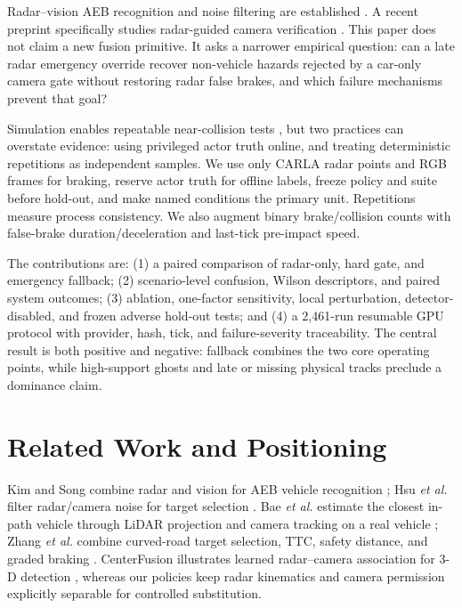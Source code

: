 \documentclass[conference]{IEEEtran}
\begin{document}
Radar--vision AEB recognition and noise filtering are established
\cite{kim2013vehicle,hsu2015noise}. A recent preprint specifically studies
radar-guided camera verification \cite{akula2026radarguided}. This paper does
not claim a new fusion primitive. It asks a narrower empirical question: can a
late radar emergency override recover non-vehicle hazards rejected by a
car-only camera gate without restoring radar false brakes, and which failure
mechanisms prevent that goal?

Simulation enables repeatable near-collision tests
\cite{dosovitskiy2017carla,kang2019testing}, but two practices can overstate
evidence: using privileged actor truth online, and treating deterministic
repetitions as independent samples. We use only CARLA radar points and RGB
frames for braking, reserve actor truth for offline labels, freeze policy and
suite before hold-out, and make named conditions the primary unit. Repetitions
measure process consistency. We also augment binary brake/collision counts with
false-brake duration/deceleration and last-tick pre-impact speed.

The contributions are: (1) a paired comparison of radar-only, hard gate, and
emergency fallback; (2) scenario-level confusion, Wilson descriptors, and
paired system outcomes; (3) ablation, one-factor sensitivity, local
perturbation, detector-disabled, and frozen adverse hold-out tests; and (4) a
2,461-run resumable GPU protocol with provider, hash, tick, and failure-severity
traceability. The central result is both positive and negative: fallback
combines the two core operating points, while high-support ghosts and late or
missing physical tracks preclude a dominance claim.

\section{Related Work and Positioning}
Kim and Song combine radar and vision for AEB vehicle recognition
\cite{kim2013vehicle}; Hsu \emph{et al.} filter radar/camera noise for target
selection \cite{hsu2015noise}. Bae \emph{et al.} estimate the closest in-path
vehicle through LiDAR projection and camera tracking on a real vehicle
\cite{bae2021cipv}; Zhang \emph{et al.} combine curved-road target selection,
TTC, safety distance, and graded braking \cite{zhang2023curved}. CenterFusion
illustrates learned radar--camera association for 3-D detection
\cite{nabati2021centerfusion}, whereas our policies keep radar kinematics and
camera permission explicitly separable for controlled substitution.
\end{document}
